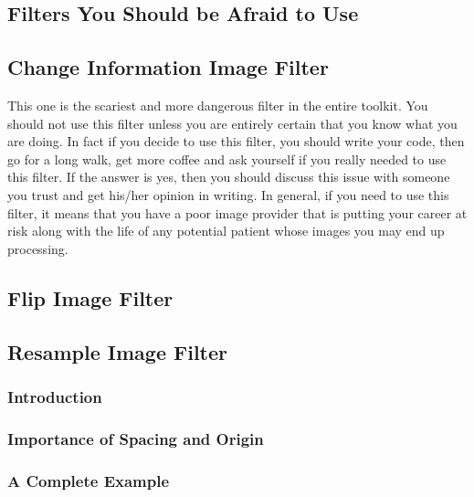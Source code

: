 \subsection{Filters You Should be Afraid to Use}

\label{sec:ScaryImageFilters}
\subsection{Change Information Image Filter}

This one is the scariest and more dangerous filter in the entire toolkit. You
should not use this filter unless you are entirely certain that you know what
you are doing. In fact if you decide to use this filter, you should write your
code, then go for a long walk, get more coffee and ask yourself if you really
needed to use this filter. If the answer is yes, then you should discuss this
issue with someone you trust and get his/her opinion in writing.  In general,
if you need to use this filter, it means that you have a poor image provider
that is putting your career at risk along with the life of any potential
patient whose images you may end up processing.

\subsection{Flip Image Filter}

\ifitkFullVersion

\fi

\subsection{Resample Image Filter}
\label{sec:ResampleImageFilter}

\subsubsection{Introduction}

\ifitkFullVersion

\fi

\subsubsection{Importance of Spacing and Origin}
\ifitkFullVersion

\fi

\subsubsection{A Complete Example}
\ifitkFullVersion

\fi

